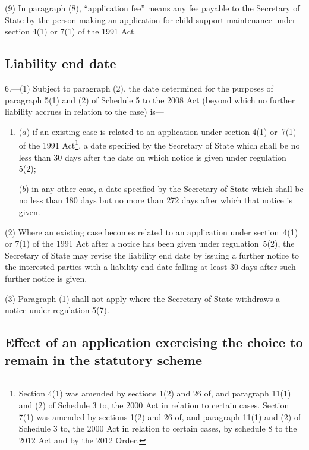 \documentclass[12pt,a4paper]{article}
\begin{document}
(9) In paragraph (8), “application fee” means any fee payable to the Secretary of State by the person making an application for child support maintenance under section 4(1) or 7(1) of the 1991 Act.

\subsection[6. Liability end date]{Liability end date}

6.—(1) Subject to paragraph (2), the date determined for the purposes of paragraph 5(1) and (2) of Schedule 5 to the 2008 Act (beyond which no further liability accrues in relation to the case) is—
\begin{enumerate}\item[]
($a$) if an existing case is related to an application under section 4(1) or~7(1) of the 1991 Act\footnote{Section 4(1) was amended by sections 1(2) and 26 of, and paragraph 11(1) and (2) of Schedule 3 to, the 2000 Act in relation to certain cases. Section 7(1) was amended by sections 1(2) and 26 of, and paragraph 11(1) and (2) of Schedule 3 to, the 2000 Act in relation to certain cases, by schedule 8 to the 2012 Act and by the 2012 Order.}, 
a date specified by the Secretary of State which shall be no less than  %
30 days after the date on which notice is given under regulation 5(2);

($b$) in any other case, a date specified by the Secretary of State which shall be no less than 180 days but no more than 272 days after which that notice is given.
\end{enumerate}

(2) Where an existing case becomes related to an application under section~4(1) or 7(1) of the 1991 Act after a notice has been given under regulation~5(2), the Secretary of State may revise the liability end date by issuing a further notice to the interested parties with a liability end date falling 
at least  %
30 days after such further notice is given.

(3) Paragraph (1) shall not apply where the Secretary of State withdraws a notice under regulation 5(7).


\subsection[7. Effect of an application exercising the choice to remain in the statutory scheme]{Effect of an application exercising the choice to remain in the statutory scheme}
\end{document}
